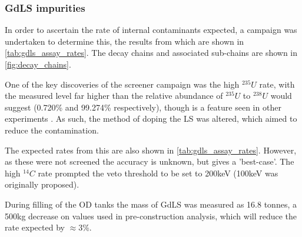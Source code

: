 \subsubsection{GdLS impurities}
\par
In order to ascertain the rate of internal contaminants expected, a campaign was undertaken \cite{scotthaselschwardt_thesis_ref} to determine this, the results from which are shown in \autoref{tab:gdls_assay_rates}.
The decay chains and associated sub-chains are shown in \autoref{fig:decay_chains}.

\par
One of the key discoveries of the screener campaign was the high ${}^{235}U$ rate, with the measured level far higher than the relative abundance of ${}^{235}U$ to ${}^{238}U$ would suggest (0.720\% and 99.274\% respectively), though is a feature seen in other experiments \cite{javierperez_thesis_ref,superkamiokande_neutron_tagging_ref}.
As such, the method of doping the LS was altered, which aimed to reduce the contamination.

\par
The expected rates from this are also shown in \autoref{tab:gdls_assay_rates}.
However, as these were not screened the accuracy is unknown, but gives a 'best-case'.
The high ${}^{14}{C}$ rate prompted the veto threshold to be set to 200keV (100keV was originally proposed).

\par
During filling of the OD tanks the mass of GdLS was measured as 16.8 tonnes, a 500kg decrease on values used in pre-construction analysis, which will reduce the rate expected by $\approx$3\%.


